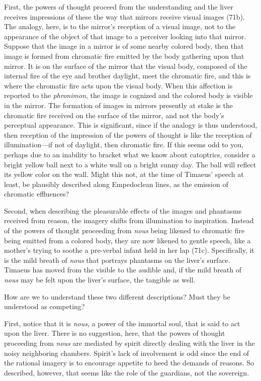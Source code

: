 First, the powers of thought proceed from the understanding and the liver receives impressions of these the way that mirrors receive visual images (71b). The analogy, here, is to the mirror's reception of a visual image, not to the appearance of the object of that image to a perceiver looking into that mirror. Suppose that the image in a mirror is of some nearby colored body, then that image is formed from chromatic fire emitted by the body gathering upon that mirror. It is on the surface of the mirror that the visual body, composed of the internal fire of the eye and brother daylight, meet the chromatic fire, and this is where the chromatic fire acts upon the visual body. When this affection is reported to the \emph{phronimon}, the image is cognized and the colored body is visible in the mirror. The formation of images in mirrors presently at stake is the chromatic fire received on the surface of the mirror, and not the body's perceptual appearance. This is significant, since if the analogy is thus understood, then reception of the impression of the powers of thought is like the reception of illumination---if not of daylight, then chromatic fire. If this seems odd to you, perhaps due to an inability to bracket what we know about catoptrics, consider a bright yellow ball next to a white wall on a bright sunny day. The ball will reflect its yellow color on the wall. Might this not, at the time of Timaeus' speech at least, be plausibly described along Empedoclean lines, as the emission of chromatic effluences? 

Second, when describing the pleasurable effects of the images and phantasms received from reason, the imagery shifts from illumination to inspiration. Instead of the powers of thought proceeding from \emph{nous} being likened to chromatic fire being emitted from a colored body, they are now likened to gentle speech, like a mother's trying to soothe a pre-verbal infant held in her lap (71c). Specifically, it is the mild breath of \emph{nous} that portrays phantasms on the liver's surface. Timaeus has moved from the visible to the audible and, if the mild breath of \emph{nous} may be felt upon the liver's surface, the tangible as well. 

How are we to understand these two different descriptions? Must they be understood as competing?

First, notice that it is \emph{nous}, a power of the immortal soul, that is said to act upon the liver. There is no suggestion, here, that the powers of thought proceeding from \emph{nous} are mediated by spirit directly dealing with the liver in the noisy neighboring chambers. Spirit's lack of involvement is odd since the end of the rational imagery is to encourage appetite to heed the demands of reasons. So described, however, that seems like the role of the guardians, not the sovereign. 

